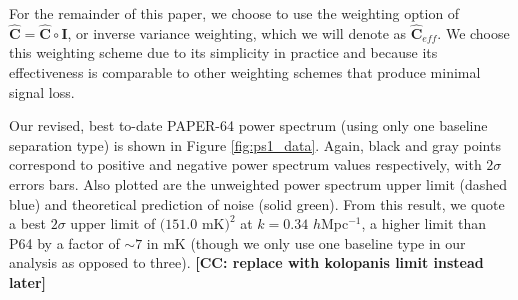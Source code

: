 \documentclass[preprint2,numberedappendix,tighten]{aastex6}  %
\newcommand{\cc}[1]{{\color{purple} \textbf{[CC: #1]}}}
\begin{document}
For the remainder of this paper, we choose to use the weighting option of $\hat{\textbf{C}} = \hat{\textbf{C}} \circ \textbf{I}$, or 
inverse variance weighting, which we will denote as $\hat{\textbf{C}}_{eff}$. We choose this weighting scheme due to its 
simplicity in practice and because its effectiveness is comparable to other weighting schemes that produce minimal signal loss.

Our revised, best to-date PAPER-64 power spectrum (using only one baseline separation type) is shown in Figure 
\ref{fig:ps1_data}. Again, black and gray points correspond to positive and negative power spectrum values respectively, with 
$2\sigma$ errors bars. Also plotted are the unweighted power spectrum upper limit (dashed blue) and theoretical prediction of 
noise (solid green). From this result, we quote a best $2\sigma$ upper limit of $(151.0$ mK$)^{2}$ at $k=0.34$ $h$Mpc$^{-1}$, 
a higher limit than P64 by a factor of $\sim7$ in mK (though we only use one baseline type in our analysis as opposed to three). 
\cc{replace with kolopanis limit instead later}
\end{document}
